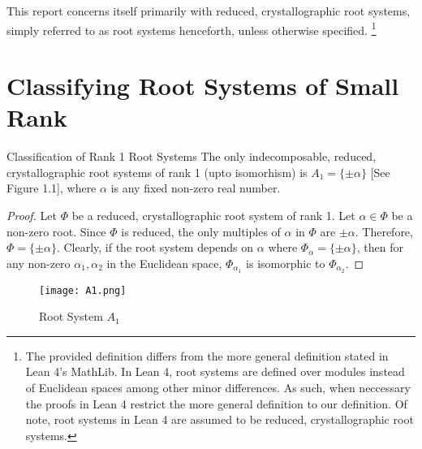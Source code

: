 This report concerns itself primarily with reduced, crystallographic root systems, simply referred to as root systems henceforth, unless otherwise specified.
\footnote{
    The provided definition differs from the more general definition stated in Lean 4's MathLib.
    In Lean 4, root systems are defined over modules instead of Euclidean spaces among other minor differences.
    As such, when neccessary the proofs in Lean 4 restrict the more general definition to our definition.
    Of note, root systems in Lean 4 are assumed to be reduced, crystallographic root systems.} \newline

\section{Classifying Root Systems of Small Rank}

\begin{namedtheorem}{Classification of Rank 1 Root Systems}
    The only indecomposable, reduced, crystallographic root systems of rank 1 (upto isomorhism) is $A_1 = \{ \pm \alpha \}$ [See Figure 1.1], where $\alpha$ is any fixed non-zero real number.
\end{namedtheorem}

\begin{proof}
    Let $\Phi$ be a reduced, crystallographic root system of rank 1.
    Let $\alpha \in \Phi$ be a non-zero root.
    Since $\Phi$ is reduced, the only multiples of $\alpha$ in $\Phi$ are $\pm \alpha$.
    Therefore, $\Phi = \{ \pm \alpha \}$.
    Clearly, if the root system depends on $\alpha$ where $\Phi_{\alpha} = \{ \pm \alpha \}$,
    then for any non-zero $\alpha_1, \alpha_2$ in the Euclidean space, $\Phi_{\alpha_1}$ is isomorphic
    to $\Phi_{\alpha_2}$.
\end{proof}

\begin{figure}[h]
    \centering
    \texttt{[image: A1.png]}
    \caption{Root System $A_1$}
\end{figure}

